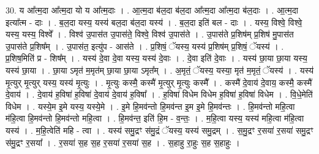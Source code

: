 \documentclass[17pt]{extarticle}
\begin{document}
30. य आ᳚त्म॒दा आ᳚त्म॒दा यो य आ᳚त्म॒दाः । . आ॒त्म॒दा ब॑ल॒दा ब॑ल॒दा आ᳚त्म॒दा आ᳚त्म॒दा ब॑ल॒दाः । . आ॒त्म॒दा इत्या᳚त्म - दाः । . ब॒ल॒दा यस्य॒ यस्य॑ बल॒दा ब॑ल॒दा यस्य॑ । . ब॒ल॒दा इति॑ बल - दाः । . यस्य॒ विश्वे॒ विश्वे॒ यस्य॒ यस्य॒ विश्वे᳚ । . विश्व॑ उ॒पास॑त उ॒पास॑ते॒ विश्वे॒ विश्व॑ उ॒पास॑ते । . उ॒पास॑ते प्र॒शिष॑म् प्र॒शिष॑ मु॒पास॑त उ॒पास॑ते प्र॒शिष᳚म् । . उ॒पास॑त॒ इत्यु॑प - आस॑ते । . प्र॒शिषं॒ ॅयस्य॒ यस्य॑ प्र॒शिष॑म् प्र॒शिषं॒ ॅयस्य॑ । . प्र॒शिष॒मिति॑ प्र - शिष᳚म् । . यस्य॑ दे॒वा दे॒वा यस्य॒ यस्य॑ दे॒वाः । . दे॒वा इति॑ दे॒वाः । . यस्य॑ छा॒या छा॒या यस्य॒ यस्य॑ छा॒या । . छा॒या ऽमृत॑ म॒मृत॑म् छा॒या छा॒या ऽमृत᳚म् । . अ॒मृतं॒ ॅयस्य॒ यस्या॒ मृत॑ म॒मृतं॒ ॅयस्य॑ । . यस्य॑ मृ॒त्युर् मृ॒त्युर् यस्य॒ यस्य॑ मृ॒त्युः । . मृ॒त्युः कस्मै॒ कस्मै॑ मृ॒त्युर् मृ॒त्युः कस्मै᳚ । . कस्मै॑ दे॒वाय॑ दे॒वाय॒ कस्मै॒ कस्मै॑ दे॒वाय॑ । . दे॒वाय॑ ह॒विषा॑ ह॒विषा॑ दे॒वाय॑ दे॒वाय॑ ह॒विषा᳚ । . ह॒विषा॑ विधेम विधेम ह॒विषा॑ ह॒विषा॑ विधेम । . वि॒धे॒मेति॑ विधेम । . यस्ये॒म इ॒मे यस्य॒ यस्ये॒मे । . इ॒मे हि॒मव॑न्तो हि॒मव॑न्त इ॒म इ॒मे हि॒मव॑न्तः । . हि॒मव॑न्तो महि॒त्वा म॑हि॒त्वा हि॒मव॑न्तो हि॒मव॑न्तो महि॒त्वा । . हि॒मव॑न्त॒ इति॑ हि॒म - व॒न्तः॒ । . म॒हि॒त्वा यस्य॒ यस्य॑ महि॒त्वा म॑हि॒त्वा यस्य॑ । . म॒हि॒त्वेति॑ महि - त्वा । . यस्य॑ समु॒द्रꣳ स॑मु॒द्रं ॅयस्य॒ यस्य॑ समु॒द्रम् । . स॒मु॒द्रꣳ र॒सया॑ र॒सया॑ समु॒द्रꣳ स॑मु॒द्रꣳ र॒सया᳚ । . र॒सया॑ स॒ह स॒ह र॒सया॑ र॒सया॑ स॒ह । . स॒हाहु रा॒हुः स॒ह स॒हाहुः । \newline
\end{document}
